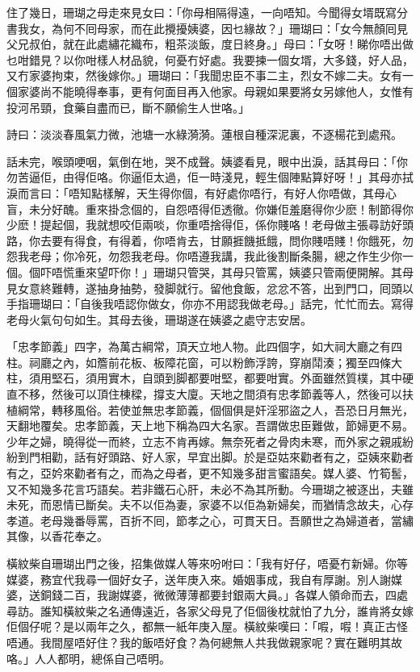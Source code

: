 \documentclass[a5paper, 12pt, openany]{book} %
\begin{document}
	住了幾日，珊瑚之母走來見女曰：「你母相隔得遠，一向唔知。今聞得女壻既寫分書我女，為何不囘母家，而在此攪擾姨婆，因乜緣故？」珊瑚曰：「女今無顏囘見父兄叔伯，就在此處繡花織布，粗茶淡飯，度日終身。」母曰：「女呀！睇你唔出做乜咁錯見？以你咁樣人材品貌，何憂冇好處。我要揀一個女壻，大多錢，好人品，又冇家婆拘束，然後嫁你。」珊瑚曰：「我聞忠臣不事二主，烈女不嫁二夫。女有一個家婆尚不能曉得奉事，更有何面目再入他家。母親如果要將女另嫁他人，女惟有投河吊頸，食藥自盡而已，斷不願偷生人世咯。」

	詩曰：淡淡春風氣力微，池塘一水綠漪漪。蓮根自種深泥裏，不逐楊花到處飛。

	話未完，喉頭哽咽，氣倒在地，哭不成聲。姨婆看見，眼中出淚，話其母曰：「你勿苦逼佢，由得佢咯。你逼佢太過，佢一時淺見，輕生個陣點算好呀！」其母亦拭淚而言曰：「唔知點樣解，天生得你個，有好處你唔行，有好人你唔做，其母心盲，未分好醜。重來掛念個的，自怨唔得佢透徹。你嫌佢羞磨得你少麽！制節得你少麽！提起個，我就想咬佢兩啖，你重唔捨得佢，係你賤咯！老母做主張尋訪好頭路，你去要有得食，有得着，你唔肯去，甘願捱饑抵餓，問你賤唔賤！你餓死，勿怨我老母；你冷死，勿怨我老母。你唔遵我講，我此後割斷条腸，總之作生少你一個。個吓唔慌重來望吓你！」珊瑚只管哭，其母只管罵，姨婆只管兩便開解。其母見女意終難轉，遂抽身抽勢，發脚就行。留他食飯，忿忿不答，出到門口，囘頭以手指珊瑚曰：「自後我唔認你做女，你亦不用認我做老母。」話完，忙忙而去。寫得老母火氣句句如生。其母去後，珊瑚遂在姨婆之處守志安居。

	「忠孝節義」四字，為萬古綱常，頂天立地人物。此四個字，如大祠大廳之有四柱。祠廳之內，如簷前花板、板障花窗，可以粉飾浮誇，穿崩鬦湊；獨至四條大柱，須用堅石，須用實木，自頭到脚都要咁堅，都要咁實。外面雖然質樸，其中硬直不移，然後可以頂住棟樑，撐支大廈。天地之間須有忠孝節義等人，然後可以扶植綱常，轉移風俗。若使並無忠孝節義，個個俱是奸淫邪盜之人，吾恐日月無光，天翻地覆矣。忠孝節義，天上地下稱為四大名家。吾謂做忠臣難做，節婦更不易。少年之婦，曉得從一而終，立志不肯再嫁。無奈死者之骨肉未寒，而外家之親戚紛紛到門相勸，話有好頭路、好人家，早宜出脚。於是亞姑來勸者有之，亞姨來勸者有之，亞妗來勸者有之，而為之母者，更不知幾多甜言蜜語矣。媒人婆、竹筍䯻，又不知幾多花言巧語矣。若非鐵石心肝，未必不為其所動。今珊瑚之被逐出，夫雖未死，而恩情已斷矣。夫不以佢為妻，家婆不以佢為新婦矣，而猶情念故夫，心存孝道。老母幾番辱罵，百折不囘，節孝之心，可貫天日。吾願世之為婦道者，當繡其像，以香花奉之。

	橫紋柴自珊瑚出門之後，招集做媒人等來吩咐曰：「我有好仔，唔憂冇新婦。你等媒婆，務宜代我尋一個好女子，送年庚入來。婚姻事成，我自有厚謝。別人謝媒婆，送銅錢二百，我謝媒婆，微微薄薄都要封銀兩大員。」各媒人領命而去，四處尋訪。誰知橫紋柴之名通傳遠近，各家父母見了佢個後枕就怕了九分，誰肯將女嫁佢個仔呢？是以兩年之久，都無一紙年庚入屋。橫紋柴嘆曰：「㗇，㗇！真正古怪唔通。我間屋唔好住？我的飯唔好食？為何總無人共我做親家呢？實在難明其故咯。」人人都明，總係自己唔明。
\end{document}
